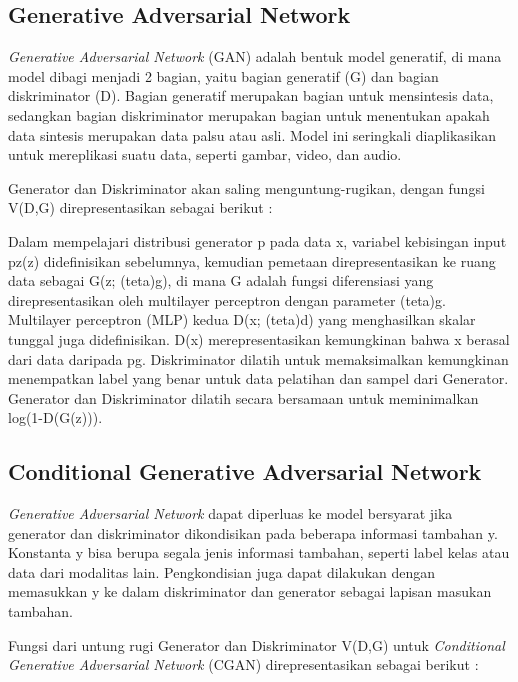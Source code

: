 \subsection{Generative Adversarial Network}
\label{subsec:generativeAdversarialNetwork}

\emph{Generative Adversarial Network} (GAN) adalah bentuk model generatif, di mana model dibagi menjadi 2 bagian, yaitu bagian generatif (G) dan bagian diskriminator (D). 
Bagian generatif merupakan bagian untuk mensintesis data, sedangkan bagian diskriminator merupakan bagian untuk menentukan apakah data sintesis merupakan data palsu atau asli. 
Model ini seringkali diaplikasikan untuk mereplikasi suatu data, seperti gambar, video, dan audio.

Generator dan Diskriminator akan saling menguntung-rugikan, dengan fungsi V(D,G) direpresentasikan sebagai berikut : 

Dalam mempelajari distribusi generator p pada data x, variabel kebisingan input pz(z) didefinisikan sebelumnya, kemudian pemetaan direpresentasikan ke ruang data sebagai G(z; (teta)g), di mana G adalah fungsi diferensiasi yang direpresentasikan oleh multilayer perceptron dengan parameter (teta)g. 
Multilayer perceptron (MLP) kedua D(x; (teta)d) yang menghasilkan skalar tunggal juga didefinisikan. 
D(x) merepresentasikan kemungkinan bahwa x berasal dari data daripada pg. 
Diskriminator dilatih untuk memaksimalkan kemungkinan menempatkan label yang benar untuk data pelatihan dan sampel dari Generator. 
Generator dan  Diskriminator dilatih secara bersamaan untuk meminimalkan log(1-D(G(z))). \parencite{GAN}

\subsection{Conditional Generative Adversarial Network}
\label{subsec:conditionalGAN}

\emph{Generative Adversarial Network} dapat diperluas ke model bersyarat jika generator dan diskriminator dikondisikan pada beberapa informasi tambahan y. 
Konstanta y bisa berupa segala jenis informasi tambahan, seperti label kelas atau data dari modalitas lain. 
Pengkondisian juga dapat dilakukan dengan memasukkan y ke dalam diskriminator dan generator sebagai lapisan masukan tambahan.

Fungsi dari untung rugi Generator dan Diskriminator V(D,G) untuk \emph{Conditional Generative Adversarial Network} (CGAN) direpresentasikan sebagai berikut :

